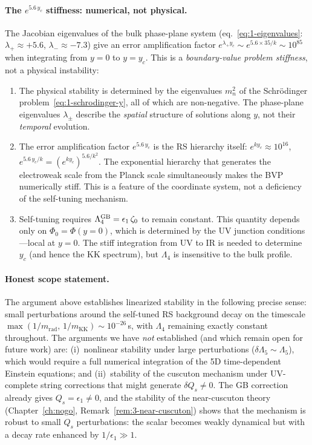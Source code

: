 \paragraph{The $e^{5.6\,y_c}$ stiffness: numerical, not physical.}
The Jacobian eigenvalues of the bulk phase-plane system (eq.~\eqref{eq:1-eigenvalues}: $\lambda_+ \approx +5.6$, $\lambda_- \approx -7.3$) give an error amplification factor $e^{\lambda_+ y_c} \sim e^{5.6 \times 35/k} \sim 10^{85}$ when integrating from $y = 0$ to $y = y_c$. This is a \emph{boundary-value problem stiffness}, not a physical instability:
\begin{enumerate}
\item The physical stability is determined by the eigenvalues $m_n^2$ of the Schr\"{o}dinger problem~\eqref{eq:1-schrodinger-y}, all of which are non-negative. The phase-plane eigenvalues $\lambda_\pm$ describe the \emph{spatial} structure of solutions along $y$, not their \emph{temporal} evolution.
\item The error amplification factor $e^{5.6\, y_c}$ is the RS hierarchy itself: $e^{ky_c} \approx 10^{16}$, $e^{5.6\, y_c/k} = (e^{ky_c})^{5.6/k^2}$. The exponential hierarchy that generates the electroweak scale from the Planck scale simultaneously makes the BVP numerically stiff. This is a feature of the coordinate system, not a deficiency of the self-tuning mechanism.
\item Self-tuning requires $\Lambda_4^{\mathrm{GB}} = \epsilon_1\,\zeta_0$ to remain constant. This quantity depends only on $\Phi_0 = \Phi(y{=}0)$, which is determined by the UV junction conditions---local at $y = 0$. The stiff integration from UV to IR is needed to determine $y_c$ (and hence the KK spectrum), but $\Lambda_4$ is insensitive to the bulk profile.
\end{enumerate}

\paragraph{Honest scope statement.} The argument above establishes linearized stability in the following precise sense: small perturbations around the self-tuned RS background decay on the timescale $\max(1/m_{\mathrm{rad}},\, 1/m_{\mathrm{KK}}) \sim 10^{-26}\,$s, with $\Lambda_4$ remaining exactly constant throughout. The arguments we have \emph{not} established (and which remain open for future work) are: (i)~nonlinear stability under large perturbations ($\delta\Lambda_5 \sim \Lambda_5$), which would require a full numerical integration of the 5D time-dependent Einstein equations; and (ii)~stability of the cuscuton mechanism under UV-complete string corrections that might generate $\delta Q_s \neq 0$. The GB correction already gives $Q_s = \epsilon_1 \neq 0$, and the stability of the near-cuscuton theory (Chapter~\ref{ch:nogo}, Remark~\ref{rem:3-near-cuscuton}) shows that the mechanism is robust to small $Q_s$ perturbations: the scalar becomes weakly dynamical but with a decay rate enhanced by $1/\epsilon_1 \gg 1$.



